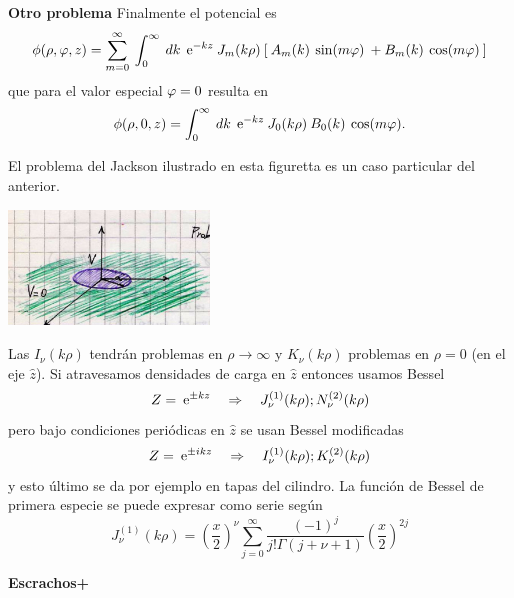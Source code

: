 \documentclass[10pt,oneside]{CBFT_book}
\begin{document}
\begin{ejemplo}{\bf Otro problema}
Finalmente el potencial es
\[
	\phi(\rho,\varphi,z) = \sum_{m=0}^\infty \: \int_0^{\infty} \: dk \:
	\:\mathrm{e}^{-kz} \: J_{m}(k\rho) \: 
	[ \: A_m(k) \: \sin(m\varphi) \: + B_m(k) \: \cos(m\varphi) \: ]
\]
que para el valor especial $\varphi=0$ resulta en
\[
	\phi(\rho,0,z) =  \int_0^{\infty} \: dk \:
	\:\mathrm{e}^{-kz} \: J_{0}(k\rho) \: B_0(k) \: \cos(m\varphi).
\]

El problema del Jackson ilustrado en esta figuretta es un caso particular del anterior.

\includegraphics[width=0.4\textwidth]{images/fig_ft1_sep_cilin_C.jpg} 
 
\end{ejemplo}





Las $I_\nu(k\rho)$ tendrán problemas en $\rho\to\infty$ y $K_\nu(k\rho)$ problemas en $\rho=0$ (en el eje 
$\hat{z}$).
Si atravesamos densidades de carga en $\hat{z}$ entonces usamos Bessel
\[
	Z = \:\mathrm{e}^{\pm k z} \quad \Rightarrow \quad J_\nu^{(1)}(k\rho) ; N_\nu^{(2)}(k\rho)
\]
pero bajo condiciones periódicas en $\hat{z}$ se usan Bessel modificadas
\[
	Z = \:\mathrm{e}^{ \pm i k z} \quad \Rightarrow \quad I_\nu^{(1)}(k\rho) ; K_\nu^{(2)}(k\rho)
\]
y esto último se da por ejemplo en tapas del cilindro.
La función de Bessel de primera especie se puede expresar como serie según
\[
	J_\nu^{(1)}(k\rho) = \left(\frac{x}{2}\right)^\nu \sum_{j=0}^\infty \frac{(-1)^j}{j!\Gamma(j+\nu +1)} 
		\left(\frac{x}{2}\right)^{2j}
\]




{\bf Escrachos+}

\end{document}
